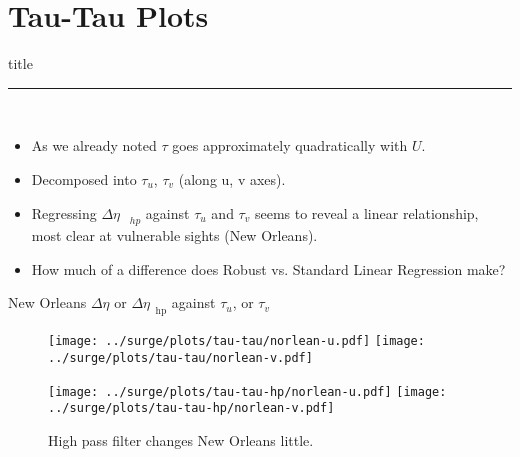 \section{Tau-Tau Plots}
    \begin{frame}[plain]
        \vfill
      \centering
      \begin{beamercolorbox}[sep=8pt,center,shadow=true,rounded=true]{title}
        \insertsectionhead\par%
        \color{oxfordblue}\noindent\rule{10cm}{1pt} \\
        \begin{itemize}
        \item As we already noted $\tau$ goes approximately quadratically with $U$.
        \item Decomposed into $\tau_u$, $\tau_v$ (along u, v axes).
        \item Regressing $\Delta\eta_{\quad hp}$ against $\tau_u$ and $\tau_v$ seems to
         reveal a linear relationship, most clear at vulnerable sights (New Orleans).
        \item How much of a difference does Robust vs. Standard Linear Regression make?
        \end{itemize}
      \end{beamercolorbox}
      \vfill
  \end{frame}

\begin{frame}{New Orleans $\Delta\eta$ or $\Delta\eta_{\;\;\mathrm{hp}}$ against $\tau_u$, or $\tau_v$}
\vspace{-30pt}
\hspace{-30pt}
 \begin{minipage}{1.15\textwidth}
\begin{figure}[htb!]
    \centering
   \hspace{-40pt} \texttt{[image: ../surge/plots/tau-tau/norlean-u.pdf]}
        \texttt{[image: ../surge/plots/tau-tau/norlean-v.pdf]}

   \hspace{-40pt} \texttt{[image: ../surge/plots/tau-tau-hp/norlean-u.pdf]}
        \texttt{[image: ../surge/plots/tau-tau-hp/norlean-v.pdf]}
    \vspace{-15pt}
    \caption{High pass filter changes New Orleans little.}
    \label{fig:A}
\end{figure}
\end{minipage}
\end{frame}

